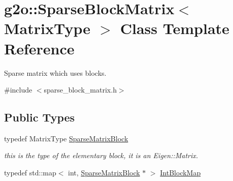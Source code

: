 \hypertarget{classg2o_1_1SparseBlockMatrix}{}\section{g2o\+:\+:Sparse\+Block\+Matrix$<$ Matrix\+Type $>$ Class Template Reference}
\label{classg2o_1_1SparseBlockMatrix}


Sparse matrix which uses blocks.  




{\ttfamily \#include $<$sparse\+\_\+block\+\_\+matrix.\+h$>$}

\subsection*{Public Types}
\begin{DoxyCompactItemize}
\item 
typedef Matrix\+Type \hyperlink{classg2o_1_1SparseBlockMatrix_ab2f7376cbf055803fda6527dcc43e3be}{Sparse\+Matrix\+Block}
\begin{DoxyCompactList}\small\item\em this is the type of the elementary block, it is an Eigen\+::\+Matrix. \end{DoxyCompactList}\item 
typedef std\+::map$<$ int, \hyperlink{classg2o_1_1SparseBlockMatrix_ab2f7376cbf055803fda6527dcc43e3be}{Sparse\+Matrix\+Block} $\ast$ $>$ \hyperlink{classg2o_1_1SparseBlockMatrix_aaa6ca1ae454ed70f62992b6401645f4e}{Int\+Block\+Map}
\end{DoxyCompactItemize}
